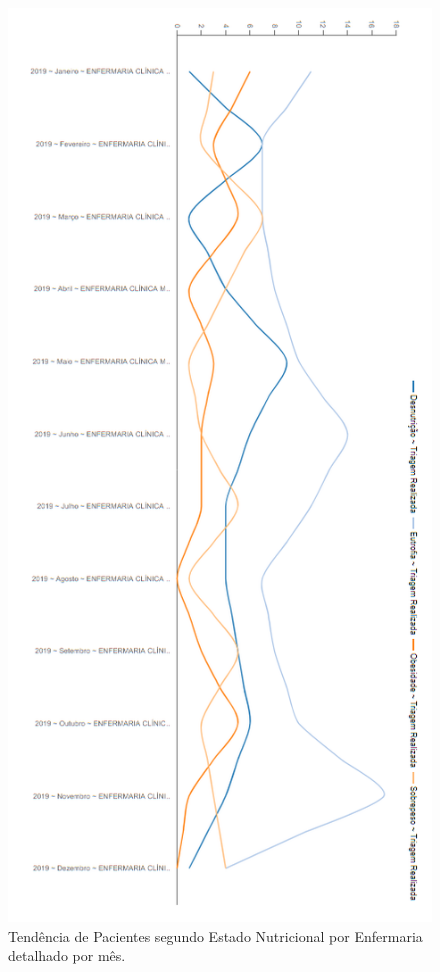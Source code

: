 \begin{figure}[htb]
	\caption{\label{dashboard_PercentualPacienteEstadoNutricionalEnfermariaMesPizza}Tendência de Pacientes segundo Estado Nutricional por Enfermaria detalhado por mês.}
	\begin{center}
	    \includegraphics[scale=0.69]{Imagens/3.4.PercentualPacienteEstadoNutricionalEnfermariaMesPizza.png}
	\end{center}
\end{figure}

